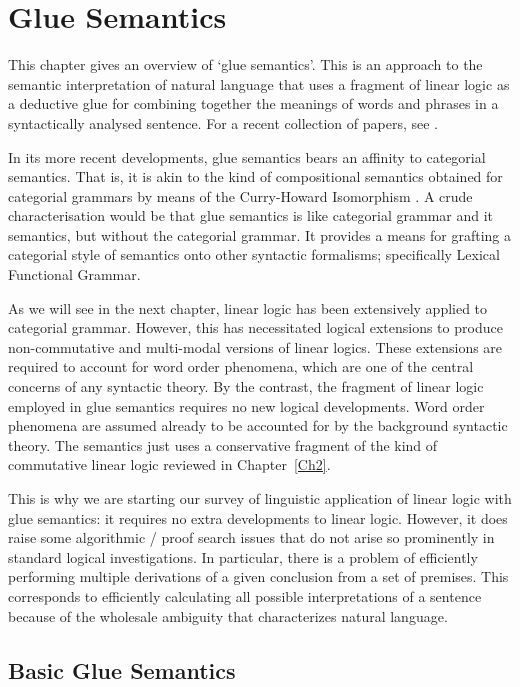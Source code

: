 \chapter{Glue Semantics}

This chapter gives an overview of `glue semantics'.
This is an approach to the
semantic interpretation of natural language that uses a fragment of linear
logic as a deductive glue for combining together the meanings of words
and phrases in a syntactically analysed sentence.  For a recent collection
of papers, see .    

In its more recent developments, glue semantics bears an affinity to categorial
semantics.  That is, it is akin to the kind of compositional semantics
obtained for categorial grammars by means of the Curry-Howard Isomorphism
.  A crude characterisation would be that
glue semantics is like categorial grammar and it semantics,
but without the categorial grammar. 
It provides a means for grafting a categorial style of semantics onto
other syntactic formalisms; specifically Lexical Functional Grammar.

As we will see in the next chapter, linear logic has been extensively
applied to categorial grammar.  However, this has necessitated logical
extensions to produce non-commutative and multi-modal versions of
linear logics.  These extensions are required to account for word order
phenomena, which are one of the central concerns of any syntactic theory.
By the contrast, the fragment of linear logic employed in glue semantics
requires no new logical developments.  Word order phenomena are assumed 
already to be accounted for by the background syntactic theory.  The semantics
just uses a conservative fragment of the kind of commutative linear logic 
reviewed in Chapter~\ref{Ch2}.  

This is why we are starting our survey of 
linguistic application of linear logic with glue semantics: it requires no
extra developments to linear logic.  However, it does raise some
algorithmic / proof search issues that do not arise so prominently in
standard logical investigations.  In particular, there is a problem
of efficiently performing multiple derivations of a given conclusion
from a set of premises.  This corresponds to efficiently calculating all
possible interpretations of a sentence because of the wholesale
ambiguity that characterizes natural language.

\section{Basic Glue Semantics}

